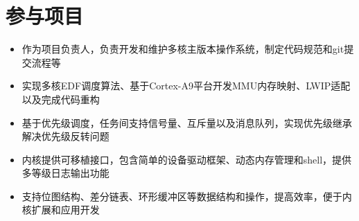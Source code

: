 \documentclass{resume}
\begin{document}


\section{参与项目}
\begin{itemize}
    \item 作为项目负责人，负责开发和维护多核主版本操作系统，制定代码规范和git提交流程等
    \item 实现多核EDF调度算法、基于Cortex-A9平台开发MMU内存映射、LWIP适配以及完成代码重构
\end{itemize}

\begin{itemize}
    \item 基于优先级调度，任务间支持信号量、互斥量以及消息队列，实现优先级继承解决优先级反转问题
    \item 内核提供可移植接口，包含简单的设备驱动框架、动态内存管理和shell，提供多等级日志输出功能
    \item 支持位图结构、差分链表、环形缓冲区等数据结构和操作，提高效率，便于内核扩展和应用开发
\end{itemize}
\end{document}
